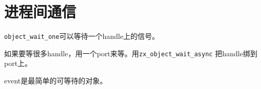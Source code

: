 \section{进程间通信}

\verb|object_wait_one|可以等待一个handle上的信号。

如果要等很多handle，用一个port来等。用\verb|zx_object_wait_async|
把handle绑到port上。

event是最简单的可等待的对象。